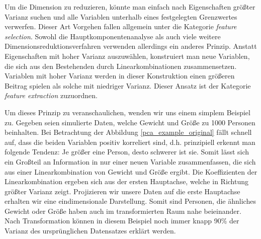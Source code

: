 Um die Dimension zu reduzieren, könnte man einfach nach Eigenschaften größter Varianz suchen und alle Variablen unterhalb eines festgelegten Grenzwertes verwerfen. Dieser Art Vorgehen fallen allgemein unter die Kategorie \textit{feature selection}. Sowohl die Hauptkomponentenanalyse als auch viele weitere Dimensionsreduktionsverfahren verwenden allerdings ein anderes Prinzip. Anstatt Eigenschaften mit hoher Varianz auszuwählen, konstruiert man neue Variablen, die sich aus den Bestehenden durch Linearkombinationen zusammensetzen. Variablen mit hoher Varianz werden in dieser Konstruktion einen größeren Beitrag spielen als solche mit niedriger Varianz. Dieser Ansatz ist der Kategorie \textit{feature extraction} zuzuordnen.

Um dieses Prinzip zu veranschaulichen, wenden wir uns einem simplem Beispiel zu. Gegeben seien simulierte Daten, welche Gewicht und Größe zu 1000 Personen beinhalten. Bei Betrachtung der Abbildung \ref{pca_example_original} fällt schnell auf, dass die beiden Variablen positiv korreliert sind, d.h. prinzipiell erkennt man folgende Tendenz: Je größer eine Person, desto schwerer ist sie. Somit lässt sich ein Großteil an Information in nur einer neuen Variable zusammenfassen, die sich aus einer Linearkombination von Gewicht und Größe ergibt. Die Koeffizienten der Linearkombination ergeben sich aus der ersten Hauptachse, welche in Richtung größter Varianz zeigt. Projizieren wir unsere Daten auf die erste Hauptachse erhalten wir eine eindimensionale Darstellung. Somit sind Personen, die ähnliches Gewicht oder Größe haben auch im transformierten Raum nahe beieinander. Nach Transformation können in diesem Beispiel noch immer knapp 90\% der Varianz des ursprünglichen Datensatzes erklärt werden.

